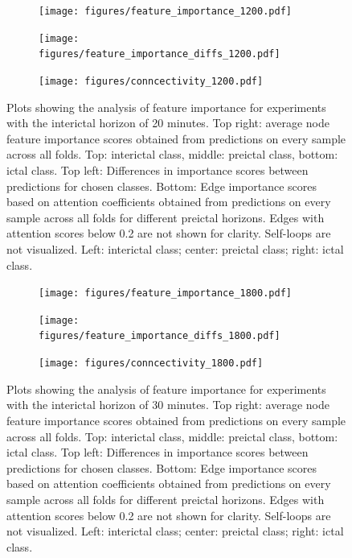 \documentclass[a4paper,fleqn]{cas-sc}
\begin{document}
\begin{figure}[h]
	\centering
	\begin{subfigure}{0.45\linewidth}
		\texttt{[image: figures/feature\_importance\_1200.pdf]}
		\label{fig:feature-importance-relative-20mins}
	\end{subfigure}
	\begin{subfigure}{0.45\linewidth}
         \centering
		\texttt{[image: figures/feature\_importance\_diffs\_1200.pdf]}
		\label{fig:feature-importance-diffs-20mins}
	\end{subfigure}
        \vfill
        \begin{subfigure}{1\linewidth}
        \centering
		\texttt{[image: figures/conncectivity\_1200.pdf]}
		\label{fig:connectivity-20mins}
	\end{subfigure}
	\caption{Plots showing the analysis of feature importance for experiments with the interictal horizon of 20 minutes. Top right: average node feature importance scores obtained from predictions on every sample across all folds. Top: interictal class, middle: preictal class, bottom: ictal class. Top left: Differences in importance scores between predictions
for chosen classes. Bottom: Edge importance scores based on attention coefficients obtained from predictions on every sample across all folds for different preictal horizons. Edges with attention scores below 0.2 are not shown for clarity. Self-loops are not visualized. Left: interictal class; center: preictal class; right: ictal class.}
	\label{fig:feature-explainability-20-mins}
\end{figure}
\FloatBarrier
\begin{figure}[h]
	\centering
	\begin{subfigure}{0.45\linewidth}
		\texttt{[image: figures/feature\_importance\_1800.pdf]}
		\label{fig:feature-importance-relative-30mins}
	\end{subfigure}
	\begin{subfigure}{0.45\linewidth}
		\texttt{[image: figures/feature\_importance\_diffs\_1800.pdf]}
		\label{fig:feature-importance-diffs-30mins}
	\end{subfigure}
        \vfill
        \begin{subfigure}{1\linewidth}
        \centering
		\texttt{[image: figures/conncectivity\_1800.pdf]}
		\label{fig:connectivity-30mins}
	\end{subfigure}
	\caption{Plots showing the analysis of feature importance for experiments with the interictal horizon of 30 minutes. Top right: average node feature importance scores obtained from predictions on every sample across all folds. Top: interictal class, middle: preictal class, bottom: ictal class. Top left: Differences in importance scores between predictions
for chosen classes. Bottom: Edge importance scores based on attention coefficients obtained from predictions on every sample across all folds for different preictal horizons. Edges with attention scores below 0.2 are not shown for clarity. Self-loops are not visualized. Left: interictal class; center: preictal class; right: ictal class.}
	\label{fig:feature-explainability-30-mins}
\end{figure}
\end{document}
